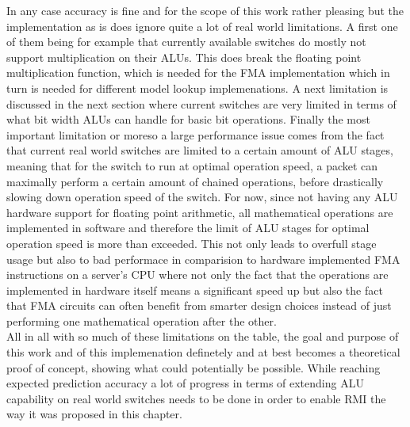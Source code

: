 In any case accuracy is fine and for the scope of this work rather pleasing but the implementation as is does ignore quite a lot of real world limitations. A first one of them being for example that currently available switches do mostly not support multiplication on their ALUs. This does break the floating point multiplication function, which is needed for the FMA implementation which in turn is needed for different model lookup implemenations. A next limitation is discussed in the next section where current switches are very limited in terms of what bit width ALUs can handle for basic bit operations. Finally the most important limitation or moreso a large performance issue comes from the fact that current real world switches are limited to a certain amount of ALU stages, meaning that for the switch to run at optimal operation speed, a packet can maximally perform a certain amount of chained operations, before drastically slowing down operation speed of the switch. For now, since not having any ALU hardware support for floating point arithmetic, all mathematical operations are implemented in software and therefore the limit of ALU stages for optimal operation speed is more than exceeded. This not only leads to overfull stage usage but also to bad performace in comparision to hardware implemented FMA instructions on a server's CPU where not only the fact that the operations are implemented in hardware itself means a significant speed up but also the fact that FMA circuits can often benefit from smarter design choices instead of just performing one mathematical operation after the other.\\

All in all with so much of these limitations on the table, the goal and purpose of this work and of this implemenation definetely and at best becomes a theoretical proof of concept, showing what could potentially be possible. While reaching expected prediction accuracy a lot of progress in terms of extending ALU capability on real world switches needs to be done in order to enable RMI the way it was proposed in this chapter.

